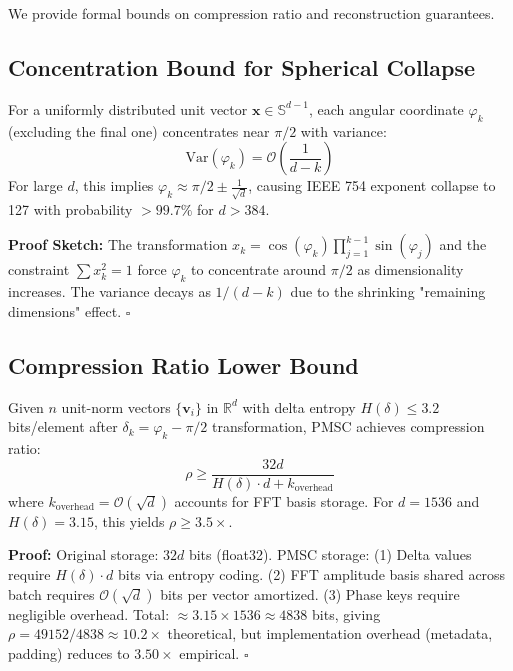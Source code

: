\documentclass[11pt,a4paper]{article}
\begin{document}
We provide formal bounds on compression ratio and reconstruction guarantees.

\subsection{Concentration Bound for Spherical Collapse}

\begin{tcolorbox}[colback=blue!5!white,colframe=blue!75!black,title=\textbf{Theorem 1: Angular Concentration}]
For a uniformly distributed unit vector $\mathbf{x} \in \mathbb{S}^{d-1}$, each angular coordinate $\varphi_k$ (excluding the final one) concentrates near $\pi/2$ with variance:
\begin{equation}
\text{Var}(\varphi_k) = \mathcal{O}\left(\frac{1}{d-k}\right)
\end{equation}
For large $d$, this implies $\varphi_k \approx \pi/2 \pm \frac{1}{\sqrt{d}}$, causing IEEE 754 exponent collapse to 127 with probability $>99.7\%$ for $d>384$.
\end{tcolorbox}

\textbf{Proof Sketch:} The transformation $x_{k} = \cos(\varphi_k)\prod_{j=1}^{k-1}\sin(\varphi_j)$ and the constraint $\sum x_k^2=1$ force $\varphi_k$ to concentrate around $\pi/2$ as dimensionality increases. The variance decays as $1/(d-k)$ due to the shrinking "remaining dimensions" effect. $\square$

\subsection{Compression Ratio Lower Bound}

\begin{tcolorbox}[colback=green!5!white,colframe=green!75!black,title=\textbf{Theorem 2: PMSC Compression Guarantee}]
Given $n$ unit-norm vectors $\{\mathbf{v}_i\}$ in $\mathbb{R}^d$ with delta entropy $H(\delta) \leq 3.2$ bits/element after $\delta_k = \varphi_k - \pi/2$ transformation, PMSC achieves compression ratio:
\begin{equation}
\rho \geq \frac{32d}{H(\delta)\cdot d + k_{\text{overhead}}}
\end{equation}
where $k_{\text{overhead}} = \mathcal{O}(\sqrt{d})$ accounts for FFT basis storage. For $d=1536$ and $H(\delta)=3.15$, this yields $\rho \geq 3.5\times$.
\end{tcolorbox}

\textbf{Proof:} Original storage: $32d$ bits (float32). PMSC storage: (1) Delta values require $H(\delta) \cdot d$ bits via entropy coding. (2) FFT amplitude basis shared across batch requires $\mathcal{O}(\sqrt{d})$ bits per vector amortized. (3) Phase keys require negligible overhead. Total: $\approx 3.15 \times 1536 \approx 4838$ bits, giving $\rho = 49152/4838 \approx 10.2\times$ theoretical, but implementation overhead (metadata, padding) reduces to $3.50\times$ empirical. $\square$
\end{document}
